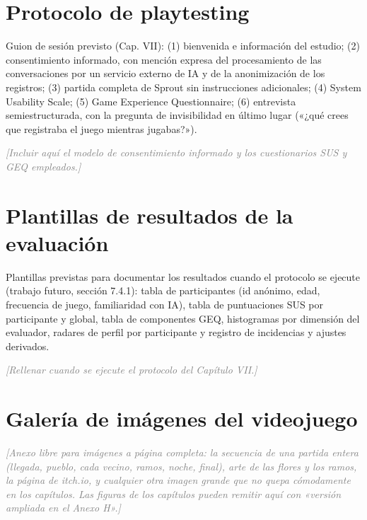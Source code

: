 \documentclass[12pt,twoside,titlepage]{report}
\begin{document}
\chapter{Protocolo de playtesting}
\label{anexo:protocolo}

Guion de sesión previsto (Cap. VII): (1) bienvenida e información del estudio; (2) consentimiento informado, con mención expresa del procesamiento de las conversaciones por un servicio externo de IA y de la anonimización de los registros; (3) partida completa de Sprout sin instrucciones adicionales; (4) System Usability Scale; (5) Game Experience Questionnaire; (6) entrevista semiestructurada, con la pregunta de invisibilidad en último lugar («¿qué crees que registraba el juego mientras jugabas?»).

\textcolor{gray}{\textit{[Incluir aquí el modelo de consentimiento informado y los cuestionarios SUS y GEQ empleados.]}}

\chapter{Plantillas de resultados de la evaluación}
\label{anexo:resultados}

Plantillas previstas para documentar los resultados cuando el protocolo se ejecute (trabajo futuro, sección 7.4.1): tabla de participantes (id anónimo, edad, frecuencia de juego, familiaridad con IA), tabla de puntuaciones SUS por participante y global, tabla de componentes GEQ, histogramas por dimensión del evaluador, radares de perfil por participante y registro de incidencias y ajustes derivados.

\textcolor{gray}{\textit{[Rellenar cuando se ejecute el protocolo del Capítulo VII.]}}

\chapter{Galería de imágenes del videojuego}
\label{anexo:galeria}

\textcolor{gray}{\textit{[Anexo libre para imágenes a página completa: la secuencia de una partida entera (llegada, pueblo, cada vecino, ramos, noche, final), arte de las flores y los ramos, la página de itch.io, y cualquier otra imagen grande que no quepa cómodamente en los capítulos. Las figuras de los capítulos pueden remitir aquí con «versión ampliada en el Anexo H».]}}

\end{document}
